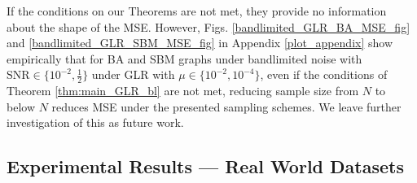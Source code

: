 If the conditions on our Theorems are not met, they provide no information about the shape of the MSE. However, Figs. \ref{bandlimited_GLR_BA_MSE_fig} and  \ref{bandlimited_GLR_SBM_MSE_fig} in Appendix \ref{plot_appendix} show empirically that for BA and SBM graphs under bandlimited noise with $\text{SNR} \in \{10^{-2}, \frac{1}{2}\}$ under GLR with $\mu \in 
\{10^{-2}, 10^{-4}\}$, even if the conditions of Theorem \ref{thm:main_GLR_bl} are not met, reducing sample size from ${N}$ to below ${N}$ reduces MSE under the presented sampling schemes. We leave further investigation of this as future work. %

{\color{black}
\subsection{Experimental Results --- Real World Datasets}


}
